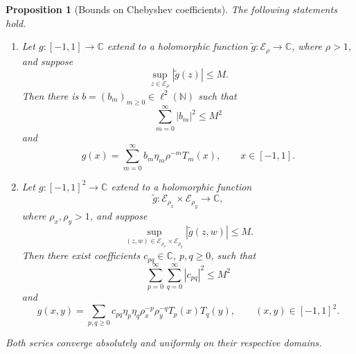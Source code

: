\documentclass[10pt,a4paper]{amsart}
\newtheorem{proposition}{Proposition}
\newcommand{\C}{\mathbb{C}}
\newcommand{\abs}[1]{\left\lvert #1\right\rvert}
\newcommand{\cE}{\mathcal{E}}
\begin{document}
\begin{proposition}[Bounds on Chebyshev coefficients]
\label{prop:weighted-chebyshev}
The following statements hold.
\begin{enumerate}
\item Let $g:[-1,1]\to\C$ extend to a holomorphic function
$\widetilde g:\cE_\rho\to\C$, where $\rho>1$, and suppose
\begin{equation}
    \sup_{z\in\cE_\rho}\abs{\widetilde g(z)}\le M.
    \label{eq:weighted-chebyshev-extension-bound}
\end{equation}
Then there is $b=(b_m)_{m\ge0}\in\ell^2(\mathbb N)$ such that
\begin{equation}
    \sum_{m=0}^\infty\abs{b_m}^2\le M^2
    \label{eq:weighted-chebyshev-norm}
\end{equation}
and
\begin{equation}
    g(x)
    =
    \sum_{m=0}^\infty
    b_m\eta_m\rho^{-m}T_m(x),
    \qquad x\in [-1, 1].
    \label{eq:weighted-chebyshev-expansion}
\end{equation}
\item Let $g:[-1,1]^2\to\C$ extend to a holomorphic function
\[
    \widetilde g:
    \cE_{\rho_x}\times\cE_{\rho_y}\to\C,
\]
where $\rho_x,\rho_y>1$, and suppose
\begin{equation}
    \sup_{(z,w)\in\cE_{\rho_x}\times\cE_{\rho_y}}
    \abs{\widetilde g(z,w)}
    \le M.
    \label{eq:weighted-bivariate-chebyshev-extension-bound}
\end{equation}
Then there exist coefficients $c_{pq}\in\C$, $p,q\ge0$, such that
\begin{equation}
    \sum_{p=0}^{\infty} \sum_{q=0}^{\infty} \abs{c_{pq}}^2
    \le
    M^2
    \label{eq:weighted-bivariate-chebyshev-norm}
\end{equation}
and
\begin{equation}
    g(x,y)
    =
    \sum_{p,q\ge0}
    c_{pq}\eta_p\eta_q
    \rho_x^{-p}\rho_y^{-q}T_p(x)T_q(y),
    \qquad (x,y)\in [-1, 1]^2.
    \label{eq:weighted-bivariate-chebyshev-expansion}
\end{equation}
\end{enumerate}
Both series converge absolutely and uniformly on their respective
domains.
\end{proposition}
\end{document}
